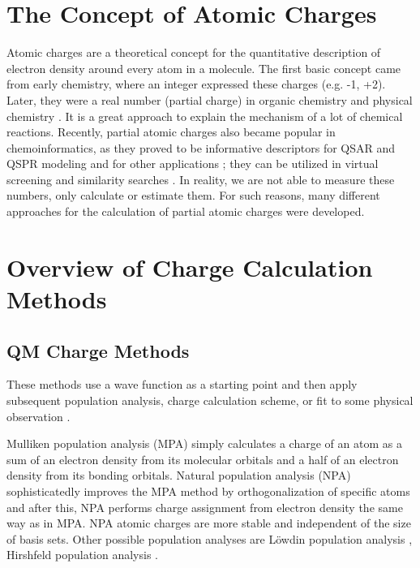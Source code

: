 \section{The Concept of Atomic Charges}

Atomic charges are a theoretical concept for the quantitative description of
electron density around every atom in a molecule. The first basic concept came
from early chemistry, where an integer expressed these charges (e.g. -1, +2).
Later, they were a real number (partial charge) in organic chemistry and
physical chemistry \cite{Atkins2011}. It is a great approach to explain the
mechanism of a lot of chemical reactions. Recently, partial atomic charges also
became popular in chemoinformatics, as they proved to be informative descriptors
for QSAR and QSPR modeling \cite{Chaves2006, Gross2002} and for other
applications \cite{Moller2005, Zhang2006, Ghafourian2000}; they can be utilized
in virtual screening \cite{Galvez1994, Stalke2011} and similarity
searches \cite{Lyne2002, Bissantz2000}. In reality, we are not able to measure
these numbers, only calculate or estimate them. For such reasons, many different
approaches for the calculation of partial atomic charges were developed.

\section{Overview of Charge Calculation Methods}

\subsection{QM Charge Methods}

These methods use a wave function as a starting point and then apply subsequent
population analysis, charge calculation scheme, or fit to some physical
observation \cite{Cramer2005}. 

Mulliken population analysis (MPA) \cite{Mulliken1955, Mulliken1955a} simply
calculates a charge of an atom as a sum of an electron density from its
molecular orbitals and a half of an electron density from its bonding orbitals.
Natural population analysis (NPA) \cite{Reed1983, Reed1985} sophisticatedly
improves the MPA method by orthogonalization of specific atoms and after this,
NPA performs charge assignment from electron density the same way as in MPA.
NPA atomic charges are more stable and independent of the size of basis sets.
Other possible population analyses are Löwdin population
analysis \cite{Lowdin1950}, Hirshfeld population analysis \cite{Hirshfeld1977}.

